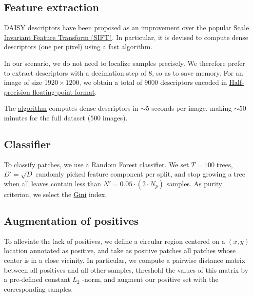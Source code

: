 \documentclass[11pt]{article}
\begin{document}
\subsection{Feature extraction}
\label{sec:org42f8f98}

DAISY descriptors have been proposed as an improvement over the popular \href{https://en.wikipedia.org/wiki/Scale-invariant\_feature\_transform}{Scale Invariant Feature Transform (SIFT)}.
In particular, it is devised to compute dense descriptors (one per pixel) using a fast algorithm.

In our scenario, we do not need to localize samples precisely.
We therefore prefer to extract descriptors with a decimation step of \(8\), so as to save memory.
For an image of size \(1920 \times 1200\), we obtain a total of \(9000\) descriptors encoded in \href{https://en.wikipedia.org/wiki/Half-precision\_floating-point\_format}{Half-precision floating-point format}.

The \href{https://github.com/scikit-image/scikit-image/blob/main/skimage/feature/\_daisy.py\#L9-L222}{algorithm} computes dense descriptors in \(\sim 5\) seconds per image, making \(\sim 50\) minutes for the full dataset (500 images).

\subsection{Classifier}
\label{sec:orgfbee2b2}

To classify patches, we use a \href{https://en.wikipedia.org/wiki/Random\_forest}{Random Forest} classifier.
We set \(T=100\) trees, \(D'=\sqrt{D}\) randomly picked feature component per split, and stop growing a tree
when all leaves contain less than \(N'=0.05 \cdot (2 \cdot N_p)\) samples.
As purity criterion, we select the \href{https://en.wikipedia.org/wiki/Gini\_coefficient}{Gini} index.

\subsection{Augmentation of positives}
\label{sec:org9c38fec}

To alleviate the lack of positives, we define a circular region centered on a \((x,y)\) location
annotated as positive, and
take as positive patches all patches whose center is in a close vicinity.
In particular, we compute a pairwise distance matrix between all positives and all other samples,
threshold the values of this matrix by a pre-defined constant \(L_2\) -norm,
and augment our positive set with the corresponding samples.
\end{document}
